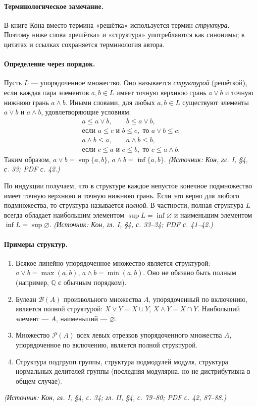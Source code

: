 \documentclass[a4paper,12pt]{article}
\begin{document}
\paragraph{Терминологическое замечание.}
В книге Кона вместо термина «решётка» используется термин \emph{структура}. Поэтому ниже слова «решётка» и «структура» употребляются как синонимы; в цитатах и ссылках сохраняется терминология автора.

\paragraph{Определение через порядок.}
Пусть \(L\) — упорядоченное множество. Оно называется \emph{структурой} (решёткой), если каждая пара элементов \(a,b\in L\) имеет точную верхнюю грань \(a\vee b\) и точную нижнюю грань \(a\wedge b\). Иными словами, для любых \(a,b\in L\) существуют элементы \(a\vee b\) и \(a\wedge b\), удовлетворяющие условиям:
\[
\begin{aligned}
&a\le a\vee b,\qquad b\le a\vee b,\\
&\text{если }a\le c\text{ и }b\le c,\text{ то }a\vee b\le c;\\[2pt]
&a\wedge b\le a,\qquad a\wedge b\le b,\\
&\text{если }c\le a\text{ и }c\le b,\text{ то }c\le a\wedge b.
\end{aligned}
\]
Таким образом, \(a\vee b=\sup\{a,b\}\), \(a\wedge b=\inf\{a,b\}\).
\textit{(Источник: Кон, гл. I, §4, с. 33; PDF с. 42.)}

По индукции получаем, что в структуре каждое непустое конечное подмножество имеет точную верхнюю и точную нижнюю грань. Если это верно для любого подмножества, то структура называется \emph{полной}. В частности, полная структура \(L\) всегда обладает наибольшим элементом \(\sup L=\inf\varnothing\) и наименьшим элементом \(\inf L=\sup\varnothing\).
\textit{(Источник: Кон, гл. I, §4, с. 33--34; PDF с. 41--42.)}

\paragraph{Примеры структур.}
\begin{enumerate}[label=(\arabic*)]
\item Всякое линейно упорядоченное множество является структурой: \(a\vee b=\max(a,b)\), \(a\wedge b=\min(a,b)\). Оно не обязано быть полным (например, \(\mathbb{Q}\) с обычным порядком).
\item Булеан \(\mathcal{B}(A)\) произвольного множества \(A\), упорядоченный по включению, является полной структурой: \(X\vee Y=X\cup Y\), \(X\wedge Y=X\cap Y\). Наибольший элемент — \(A\), наименьший — \(\varnothing\).
\item Множество \(\mathcal{P}(A)\) всех левых отрезков упорядоченного множества \(A\), упорядоченное по включению, является полной структурой.
\item Структура подгрупп группы, структура подмодулей модуля, структура нормальных делителей группы (последняя модулярна, но не дистрибутивна в общем случае).
\end{enumerate}
\textit{(Источник: Кон, гл. I, §4, с. 34; гл. II, §4, с. 79--80; PDF с. 42, 87--88.)}
\end{document}
